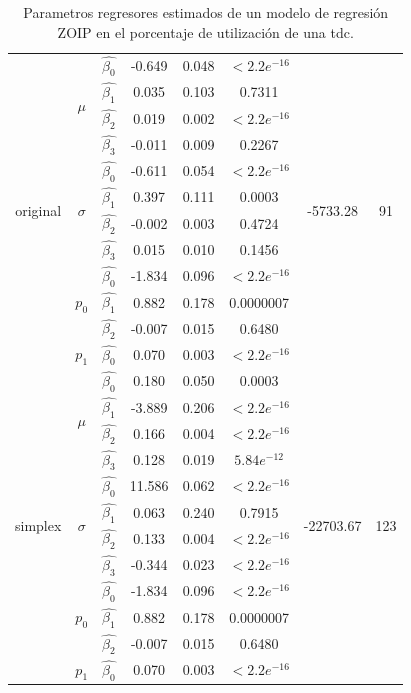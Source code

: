 \begin{table}[!hbt]
{\begin{center}
\begin{tabular}{|c|c|c|ccc|c|c|}
\multirow{12}{*}{original} & \multirow{4}{*}{$\mu$} & $\hat{\beta_0}$ & -0.649	&0.048	&$<2.2e^{-16}$  & \multirow{12}{*}{-5733.28} & \multirow{12}{*}{91} \\
& & $\hat{\beta_1}$ & 0.035	&0.103	&0.7311   & &\\
& & $\hat{\beta_2}$ & 0.019	&0.002	&$<2.2e^{-16}$   & &\\
& & $\hat{\beta_3}$ & -0.011	&0.009	&0.2267 & & \\ \cline{2-6}
& \multirow{4}{*}{$\sigma$} & $\hat{\beta_0}$ & -0.611	&0.054	&$<2.2e^{-16}$   & &\\
& & $\hat{\beta_1}$ & 0.397	&0.111	&0.0003   & &\\
& & $\hat{\beta_2}$ & -0.002	&0.003	&0.4724   & &\\
& & $\hat{\beta_3}$ & 0.015	&0.010	&0.1456   & &\\ \cline{2-6}
& \multirow{3}{*}{$p_0$} & $\hat{\beta_0}$ & -1.834	&0.096	&$<2.2e^{-16}$   & &\\
& & $\hat{\beta_1}$ & 0.882	&0.178	&0.0000007   & &\\
& & $\hat{\beta_2}$ & -0.007	&0.015	&0.6480   & &\\ \cline{2-6}
& $p_1$ & $\hat{\beta_0}$ & 0.070	&0.003	&$<2.2e^{-16}$   & &\\ \hline \hline

\multirow{12}{*}{simplex} & \multirow{4}{*}{$\mu$} & $\hat{\beta_0}$ & 0.180	&0.050	&0.0003  & \multirow{12}{*}{-22703.67} & \multirow{12}{*}{123} \\
& & $\hat{\beta_1}$ & -3.889	&0.206	&$<2.2e^{-16}$& &\\
& & $\hat{\beta_2}$ & 0.166	&0.004	&$<2.2e^{-16}$& &\\
& & $\hat{\beta_3}$ & 0.128	&0.019	&$5.84e^{-12}$& & \\ \cline{2-6}
& \multirow{4}{*}{$\sigma$} & $\hat{\beta_0}$ & 11.586	&0.062	&$<2.2e^{-16}$& &\\
& & $\hat{\beta_1}$ & 0.063	&0.240	&0.7915& &\\
& & $\hat{\beta_2}$ & 0.133	&0.004	&$<2.2e^{-16}$   & &\\
& & $\hat{\beta_3}$ & -0.344	&0.023	&$<2.2e^{-16}$   & &\\ \cline{2-6}
& \multirow{3}{*}{$p_0$} & $\hat{\beta_0}$ & -1.834	&0.096	&$<2.2e^{-16}$   & &\\
& & $\hat{\beta_1}$ & 0.882	&0.178	&0.0000007   & &\\
& & $\hat{\beta_2}$ & -0.007	&0.015	&0.6480   & &\\ \cline{2-6}
& $p_1$ & $\hat{\beta_0}$ & 0.070	&0.003	&$<2.2e^{-16}$   & &\\ \hline

\end{tabular}
\caption{Parametros regresores estimados de un modelo de regresi\'{o}n ZOIP en el porcentaje de utilizaci\'{o}n de una tdc.}
\label{T_Apli_CC}
\end{center}
}
\end{table}


